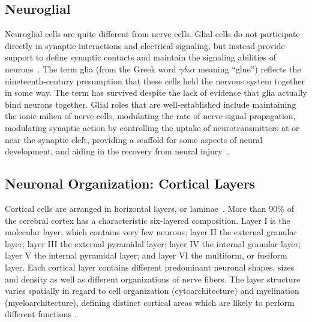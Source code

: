 

\subsection{Neuroglial}
Neuroglial cells are quite different from nerve cells. Glial cells do not
participate directly in synaptic interactions and electrical signaling, but
instead provide support to define synaptic contacts and maintain the signaling
abilities of neurons~\cite{Purves2004}. The term glia (from the Greek word
$\gamma\delta\iota\alpha$ meaning “glue”) reflects the nineteenth-century presumption that these
cells held the nervous system together in some way. The term has survived 
despite the lack of evidence that glia actually bind neurons together. Glial
roles that are well-established include maintaining the ionic milieu of nerve
cells, modulating the rate of nerve signal propagation, modulating synaptic
action by controlling the uptake of neurotransmitters at or near the synaptic
cleft, providing a scaffold for some aspects of neural development, and aiding
in the recovery from neural injury~\cite{Purves2004}.

\subsection{Neuronal Organization: Cortical Layers}

Cortical cells are arranged in horizontal layers, or laminae~\cite{Waehnert2014}.
More than 90\% of the cerebral cortex has a characteristic six-layered composition\cite{RandS.SwensonM.D.2006}.
Layer I is the molecular
layer, which contains very few neurons; layer II the external granular layer;
layer III the external pyramidal layer; layer IV the internal granular layer;
layer V the internal pyramidal layer; and layer VI the multiform, or fusiform
layer. Each cortical layer contains different predominant neuronal shapes, sizes and density
as well as different organizations of nerve fibers\cite{RandS.SwensonM.D.2006}.
The layer structure varies spatially in regard to cell organization (cytoarchitecture) and 
myelination (myeloarchitecture), defining distinct cortical areas which are
likely to perform different functions \cite{Waehnert2014, Bok1929}. 


